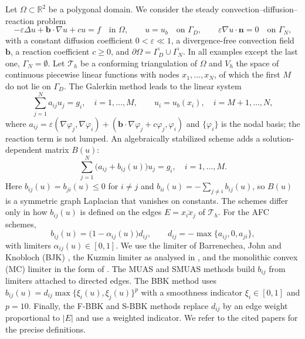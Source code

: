 \documentclass[11pt,a4paper]{article}
\newcommand{\eps}{\varepsilon}
\newcommand{\bb}{\boldsymbol{b}}
\newcommand{\T}{\mathcal{T}_h}
\theoremstyle{remark}
\begin{document}
Let $\Omega\subset\mathbb{R}^2$ be a polygonal domain. We consider the steady convection--diffusion--reaction problem
\begin{equation}\label{eq:cdr}
  -\eps\Delta u+\bb\cdot\nabla u+cu=f\quad\text{in }\Omega,\qquad u=u_b\quad\text{on }\Gamma_D,\qquad
  \eps\nabla u\cdot\boldsymbol{n}=0\quad\text{on }\Gamma_N,
\end{equation}
with a constant diffusion coefficient $0<\eps\ll1$, a divergence-free convection field $\bb$, a reaction coefficient
$c\ge0$, and $\partial\Omega=\overline{\Gamma_D}\cup\overline{\Gamma_N}$. In all examples except the last one,
$\Gamma_N=\emptyset$. Let $\T$ be a conforming triangulation of $\Omega$ and $V_h$ the space of continuous piecewise
linear functions with nodes $x_1,\dots,x_N$, of which the first $M$ do not lie on $\Gamma_D$. The Galerkin method
leads to the linear system
\begin{equation*}
  \sum_{j=1}^N a_{ij}u_j=g_i,\quad i=1,\dots,M,\qquad u_i=u_b(x_i),\quad i=M+1,\dots,N,
\end{equation*}
where $a_{ij}=\eps(\nabla\varphi_j,\nabla\varphi_i)+(\bb\cdot\nabla\varphi_j+c\varphi_j,\varphi_i)$ and
$\{\varphi_i\}$ is the nodal basis; the reaction term is not lumped. An algebraically stabilized scheme adds a
solution-dependent matrix $B(u)$:
\begin{equation}\label{eq:as}
  \sum_{j=1}^N\bigl(a_{ij}+b_{ij}(u)\bigr)u_j=g_i,\quad i=1,\dots,M.
\end{equation}
Here $b_{ij}(u)=b_{ji}(u)\le0$ for $i\neq j$ and $b_{ii}(u)=-\sum_{j\neq i}b_{ij}(u)$, so $B(u)$ is a symmetric graph
Laplacian that vanishes on constants. The schemes differ only in how $b_{ij}(u)$ is defined on the edges
$E=\overline{x_ix_j}$ of $\T$. For the AFC schemes,
\begin{equation*}
  b_{ij}(u)=\bigl(1-\alpha_{ij}(u)\bigr)d_{ij},\qquad d_{ij}=-\max\{a_{ij},0,a_{ji}\},
\end{equation*}
with limiters $\alpha_{ij}(u)\in[0,1]$. We use the limiter of Barrenechea, John and Knobloch (BJK) \cite{BJK17}, the
Kuzmin limiter \cite{Kuz07} as analysed in \cite{BJK16}, and the monolithic convex (MC) limiter \cite{Kuz20} in the
form of \cite{AJ27}. The MUAS \cite{JK22} and SMUAS \cite{Kno23} methods build $b_{ij}$ from limiters attached to
directed edges. The BBK method \cite{BBK17} uses $b_{ij}(u)=d_{ij}\max\{\xi_i(u),\xi_j(u)\}^p$ with a smoothness
indicator $\xi_i\in[0,1]$ and $p=10$. Finally, the F-BBK and S-BBK methods \cite{ABR17} replace $d_{ij}$ by an edge
weight proportional to $|E|$ and use a weighted indicator. We refer to the cited papers for the precise definitions.
\end{document}
